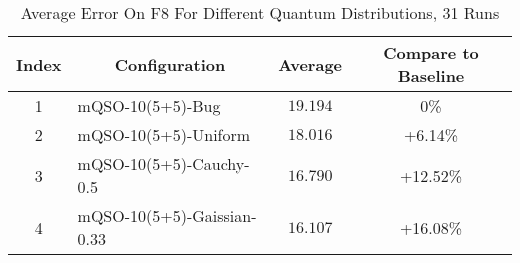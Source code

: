 \begin{table}
  \centering
  \caption{Average Error On F8 For Different Quantum Distributions, 31 Runs}
  \begin{tabular}{|c|l|c|c|}
    \hline
    Index & \multicolumn{1}{c|}{Configuration} & Average & Compare to Baseline \\
    \hline
    1 & mQSO-10(5+5)-Bug & $19.194$ & 0\%\\
    2 & mQSO-10(5+5)-Uniform & $18.016$ & +6.14\%\\
    3 & mQSO-10(5+5)-Cauchy-0.5 & $16.790$ & +12.52\%\\
    4 & mQSO-10(5+5)-Gaissian-0.33 & $16.107$ & +16.08\%\\
    \hline
  \end{tabular}
\end{table}
